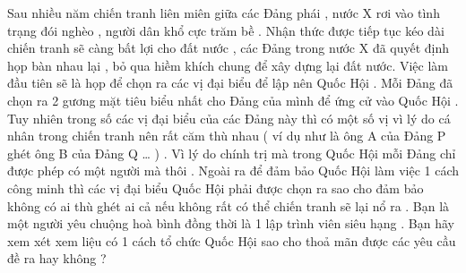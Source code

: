 Sau nhiều năm chiến tranh liên miên giữa các Đảng phái , nước X rơi vào tình trạng đói nghèo , người dân khổ cực trăm bề . Nhận thức được tiếp tục kéo dài chiến tranh sẽ càng bất lợi cho đất nước , các Đảng trong nước X đã quyết định họp bàn nhau lại , bỏ qua hiềm khích chung để xây dựng lại đất nước. Việc làm đầu tiên sẽ là họp để chọn ra các vị đại biểu để lập nên Quốc Hội . Mỗi Đảng đã chọn ra 2 gương mặt tiêu biểu nhất cho Đảng của mình để ứng cử vào Quốc Hội . Tuy nhiên trong số các vị đại biểu của các Đảng này thì có một số vị vì lý do cá nhân trong chiến tranh nên rất căm thù nhau ( ví dụ như là ông A của Đảng P ghét ông B của Đảng Q … ) . Vì lý do chính trị mà trong Quốc Hội mỗi Đảng chỉ được phép có một người mà thôi . Ngoài ra để đảm bảo Quốc Hội làm việc 1 cách công minh thì các vị đại biểu Quốc Hội phải được chọn ra sao cho đảm bảo không có ai thù ghét ai cả nếu không rất có thể chiến tranh sẽ lại nổ ra . Bạn là một người yêu chuộng hoà bình đồng thời là 1 lập trình viên siêu hạng . Bạn hãy xem xét xem liệu có 1 cách tổ chức Quốc Hội sao cho thoả mãn được các yêu cầu đề ra hay không ?  

\
